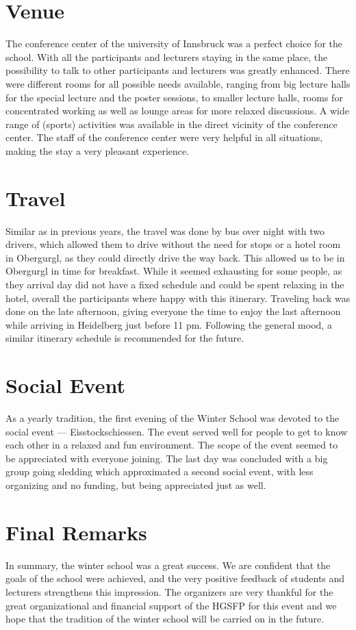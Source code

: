 \section*{Venue}
The conference center of the university of Innsbruck was a perfect choice for the school. With all the participants and lecturers staying in the same place, the possibility to talk to other participants and lecturers was greatly enhanced. There were different rooms for all possible needs available, ranging from big lecture halls for the special lecture and the poster sessions, to smaller lecture halls, rooms for concentrated working as well as lounge areas for more relaxed discussions. A wide range of (sports) activities was available in the direct vicinity of the conference center. The staff of the conference center were very helpful in all situations, making the stay a very pleasant experience.


\section*{Travel}
Similar as in previous years, the travel was done by bus over night with two drivers, which allowed them to drive without the need for stops or a hotel room in Obergurgl,
as they could directly drive the way back. This allowed us to be in Obergurgl in time for breakfast. While it seemed exhausting for some people, as they arrival day did not have a 
fixed schedule and could be spent relaxing in the hotel, overall the participants where happy with this itinerary.
Traveling back was done on the late afternoon, giving everyone the time to enjoy the last afternoon while arriving in Heidelberg just before 11 pm. Following the general mood, a similar itinerary schedule is recommended for the future.

\section*{Social Event}
As a yearly tradition, the first evening of the Winter School was
devoted to the social event — Eisstockschiessen. The event served well for people to get to know each other in a relaxed and fun environment. The scope of the event seemed to be appreciated with everyone joining.
The last day was concluded with a big group going sledding which approximated a second social event, 
with less organizing and no funding, but being appreciated just as well.

\section*{Final Remarks}
In summary, the winter school was a great success. We are confident that the goals of the school were achieved, and the very positive feedback of students and lecturers strengthens this impression. The organizers are very thankful for the great organizational and financial support of the HGSFP for this event and we hope that the tradition of the winter school will be carried on in the future.


